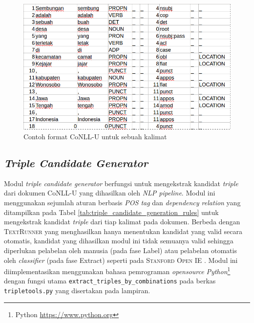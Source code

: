 \begin{figure}
\centering
\includegraphics[width=\textwidth]{../images/conllu_example.png}
\caption{Contoh format CoNLL-U untuk sebuah kalimat}
\label{fig:conllu_example}
\end{figure}

\subsection{\textit{Triple Candidate Generator}} \label{Triple Candidate Generator}

Modul \textit{triple candidate generator} berfungsi untuk mengekstrak kandidat \textit{triple} dari dokumen CoNLL-U yang dihasilkan oleh \textit{NLP pipeline}. Modul ini menggunakan sejumlah aturan berbasis \textit{POS tag} dan \textit{dependency relation} yang ditampilkan pada Tabel \ref{tab:triple_candidate_generation_rules} untuk mengekstrak kandidat \textit{triple} dari tiap kalimat pada dokumen. Berbeda dengan \textsc{TextRunner} \citep{banko2007open} yang menghasilkan hanya menentukan kandidat yang valid secara otomatis, kandidat yang dihasilkan modul ini tidak semuanya valid sehingga diperlukan pelabelan oleh manusia (pada fase Label) atau pelabelan otomatis oleh \textit{classifier} (pada fase Extract) seperti pada \textsc{Stanford Open IE} \citep{angeli2015leveraging}. Modul ini diimplementasikan menggunakan bahasa pemrograman \textit{opensource} \textit{Python}\footnote{Python \url{https://www.python.org}} dengan fungsi utama \verb|extract_triples_by_combinations| pada berkas \verb|tripletools.py| yang disertakan pada lampiran.

